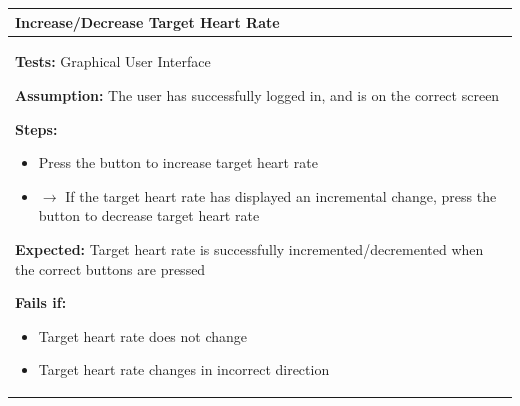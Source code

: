 \documentclass[letterpaper,english, 12pt]{scrreprt}
\begin{document}
\begin{center}
        \begin{tabular}{|C{15cm}|}
                \hline
                        \textbf{Increase/Decrease Target Heart Rate}\\
                \hline
                        \begin{flushleft}
                                \textbf{Tests: } Graphical User Interface
                        \end{flushleft}
                        \begin{flushleft}
                                \textbf{Assumption: } The user has successfully logged in, and is on the correct screen
                        \end{flushleft}
                        \begin{flushleft}
                                \textbf{Steps:}
                        \end{flushleft}
				\begin{itemize}
					\item Press the button to increase target heart rate
					\item $\rightarrow$ If the target heart rate has displayed an incremental change, press the button to decrease target heart rate
				\end{itemize}
			\begin{flushleft}
				\textbf{Expected: } Target heart rate is successfully incremented/decremented when the correct buttons are pressed
			\end{flushleft}
                        \begin{flushleft}
                                \textbf{Fails if: }
                        \end{flushleft}
                                \begin{itemize}
                                        \item Target heart rate does not change
					\item Target heart rate changes in incorrect direction
                                \end{itemize}
				\\
		\hline
        \end{tabular}
\end{center}
\end{document}
